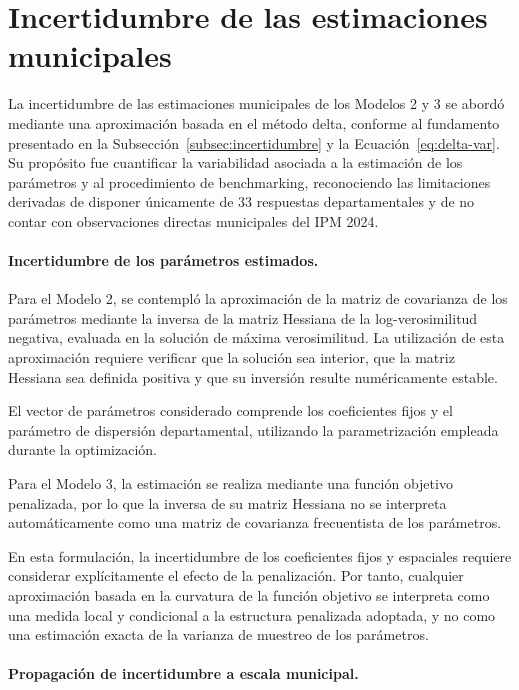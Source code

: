 
\section{Incertidumbre de las estimaciones municipales}
\label{sec:met-incertidumbre}

La incertidumbre de las estimaciones municipales de los Modelos 2 y 3 se abordó mediante una aproximación basada en el método delta, conforme al fundamento presentado en la Subsección~\ref{subsec:incertidumbre} y la Ecuación~\ref{eq:delta-var}. Su propósito fue cuantificar la variabilidad asociada a la estimación de los parámetros y al procedimiento de benchmarking, reconociendo las limitaciones derivadas de disponer únicamente de 33 respuestas departamentales y de no contar con observaciones directas municipales del IPM 2024.

\paragraph{Incertidumbre de los parámetros estimados.}

Para el Modelo 2, se contempló la aproximación de la matriz de covarianza de los parámetros mediante la inversa de la matriz Hessiana de la log-verosimilitud negativa, evaluada en la solución de máxima verosimilitud. La utilización de esta aproximación requiere verificar que la solución sea interior, que la matriz Hessiana sea definida positiva y que su inversión resulte numéricamente estable.

El vector de parámetros considerado comprende los coeficientes fijos y el parámetro de dispersión departamental, utilizando la parametrización empleada durante la optimización.

Para el Modelo 3, la estimación se realiza mediante una función objetivo penalizada, por lo que la inversa de su matriz Hessiana no se interpreta automáticamente como una matriz de covarianza frecuentista de los parámetros.

En esta formulación, la incertidumbre de los coeficientes fijos y espaciales requiere considerar explícitamente el efecto de la penalización. Por tanto, cualquier aproximación basada en la curvatura de la función objetivo se interpreta como una medida local y condicional a la estructura penalizada adoptada, y no como una estimación exacta de la varianza de muestreo de los parámetros.

\paragraph{Propagación de incertidumbre a escala municipal.}

